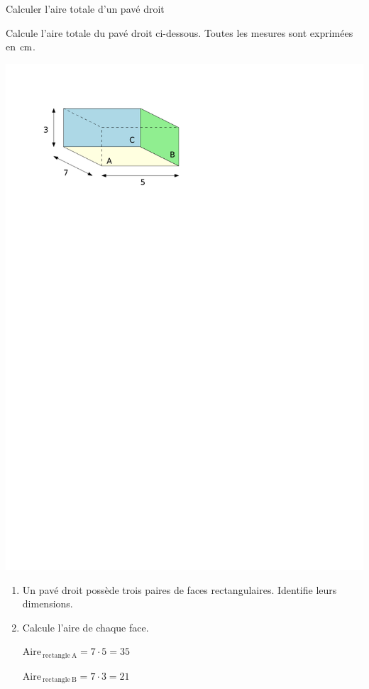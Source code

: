 \documentclass[a4paper,11pt]{report}
\begin{document}
\begin{resolu}{Calculer l'aire totale d'un pavé droit}{
Calcule l'aire totale du pavé droit ci-dessous. Toutes les mesures sont exprimées en $\tunit{}{\centi m}$.
\begin{center}
    \includegraphics[scale=1]{media/gm-02/resolu-pave-droit.pdf}
\end{center}
\begin{enumerate}
    \item Un pavé droit possède trois paires de faces rectangulaires. Identifie leurs dimensions. 

    
    \item Calcule l'aire de chaque face.

    $\mathrm{Aire}_{\mathrm{~rectangle~A}}=7\cdot5=35$

    $\mathrm{Aire}_{\mathrm{~rectangle~B}}=7\cdot3=21$


\end{enumerate}}
\end{resolu}
\end{document}
